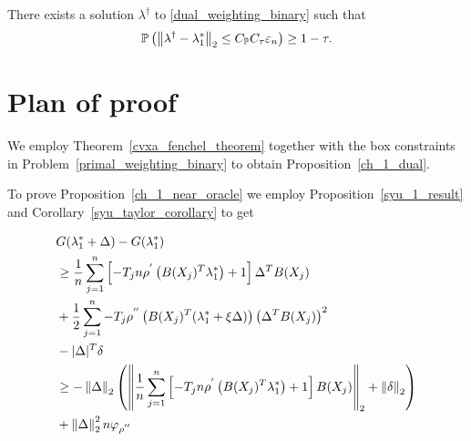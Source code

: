 \begin{proposition}
  \label{ch_1_near_oracle}
  There exists a solution $\lambda^\dagger$ 
  to \eqref{dual_weighting_binary}
  such that
  \begin{gather}
    \mathbb{P}
    \left( 
      \left\lVert
        \lambda^\dagger
        -
        \lambda^*_1
      \right\rVert_2
      \le
      C_{\mathbb{P}} C_\tau \varepsilon_n
    \right)
    \ge 
    1 - \tau
    .
  \end{gather}
\end{proposition}


\section{Plan of proof}
We employ 
Theorem~\ref{cvxa_fenchel_theorem}
together with the box constraints in Problem~\eqref{primal_weighting_binary}
to obtain Proposition~\ref{ch_1_dual}.

To prove Proposition~\ref{ch_1_near_oracle}
we employ
Proposition~\ref{syu_1_result}
and 
Corollary~\ref{syu_taylor_corollary}
to get

\begin{align}
  \begin{split}
  & G(\lambda^*_1 + \Delta) 
  -
  G(\lambda^*_1)
  \\
  &\ge
      \frac{1}{n}
      \sum_{j = 1}^{n} 
      \left[ 
        -T_j n 
        \rho^{'} 
        \left( 
          B(X_j)^T \lambda^*_1
        \right)
      +
      1
      \right]
      \Delta^T B(X_j)
      \\
  & +
      \frac{1}{2}
      \sum_{j = 1}^{n} 
        -T_j  
        \rho^{''} 
        \left( 
          B(X_j)^T (\lambda^*_1 + \xi \Delta)
        \right)
        \left( 
          \Delta^T
          B(X_j)
        \right)^2
        \\
  &-
      |\Delta|^T \delta
  \\
  &\ge
    - \left\lVert\Delta\right\rVert_2
    \left( 
    \left\lVert
      \frac{1}{n}
      \sum_{j = 1}^{n} 
      \left[ 
        -T_j n 
        \rho^{'} 
        \left( 
          B(X_j)^T \lambda^*_1
        \right)
      +
      1
      \right]
      B(X_j)
    \right\rVert_2
    +
    \left\lVert\delta\right\rVert_2
    \right)
    \\
  &+
  \left\lVert\Delta\right\rVert^2_2
  n \varphi_{\rho^{''}}
  \end{split}
\end{align}
